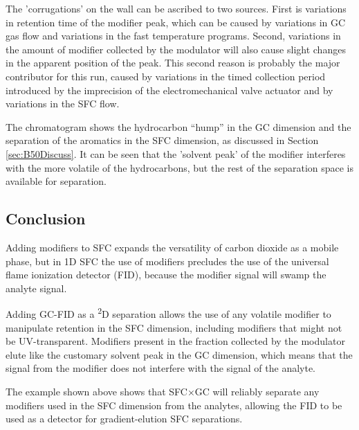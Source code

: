 The 'corrugations' on the wall can be ascribed to two sources. First is
variations in retention time of the modifier peak, which can be caused by
variations in GC gas flow and variations in the fast temperature programs.
Second, variations in the amount of modifier collected by the modulator will
also cause slight changes in the apparent position of the peak. This second
reason is probably the major contributor for this run, caused by variations in
the timed collection period introduced by the imprecision of the
electromechanical valve actuator and by variations in the SFC flow.

The chromatogram shows the hydrocarbon ``hump'' in the GC dimension and the
separation of the aromatics in the SFC dimension, as discussed in Section
\ref{sec:B50Discuss}. It can be seen that the 'solvent peak' of the modifier
interferes with the more volatile of the hydrocarbons, but the rest of the
separation space is available for separation. 

\subsection{Conclusion}

Adding modifiers to SFC expands the versatility of carbon dioxide as a mobile
phase, but in 1D SFC the use of modifiers precludes the use of the universal
flame ionization detector (FID), because the modifier signal will swamp the
analyte signal.

Adding GC-FID as a \textsuperscript{2}D separation allows the use of any
volatile modifier to manipulate retention in the SFC dimension, including
modifiers that might not be UV-transparent. Modifiers present in the fraction
collected by the modulator elute like the customary solvent peak in the GC
dimension, which means that the signal from the modifier does not interfere with
the signal of the analyte.

The example shown above shows that SFC×GC will reliably separate any modifiers
used in the SFC dimension from the analytes, allowing the FID to be used as a
detector for gradient-elution SFC separations.


